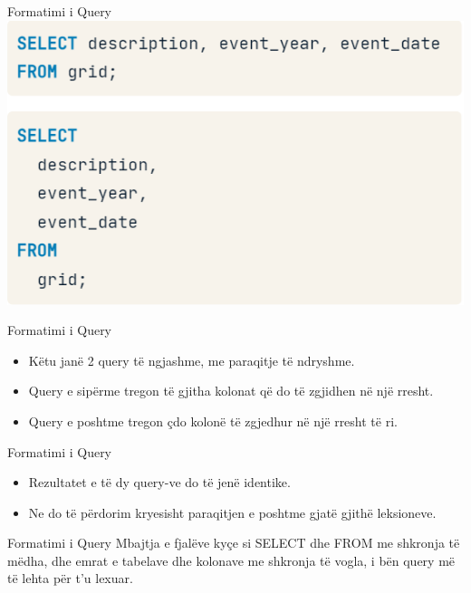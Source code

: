 \documentclass[
  ignorenonframetext,
]{beamer}
\begin{document}
\begin{frame}{Formatimi i Query}
\label{formatimi-i-query-1}
\includegraphics{./Figs/sql15.png}
\end{frame}

\begin{frame}{Formatimi i Query}
\label{formatimi-i-query-2}
\begin{itemize}
\item
  Këtu janë 2 query të ngjashme, me paraqitje të ndryshme.
\item
  Query e sipërme tregon të gjitha kolonat që do të zgjidhen në një
  rresht.
\item
  Query e poshtme tregon çdo kolonë të zgjedhur në një rresht të ri.
\end{itemize}
\end{frame}

\begin{frame}{Formatimi i Query}
\label{formatimi-i-query-3}
\begin{itemize}
\item
  Rezultatet e të dy query-ve do të jenë identike.
\item
  Ne do të përdorim kryesisht paraqitjen e poshtme gjatë gjithë
  leksioneve.
\end{itemize}
\end{frame}

\begin{frame}{Formatimi i Query}
\label{formatimi-i-query-4}
Mbajtja e fjalëve kyçe si SELECT dhe FROM me shkronja të mëdha, dhe
emrat e tabelave dhe kolonave me shkronja të vogla, i bën query më të
lehta për t'u lexuar.
\end{frame}
\end{document}
